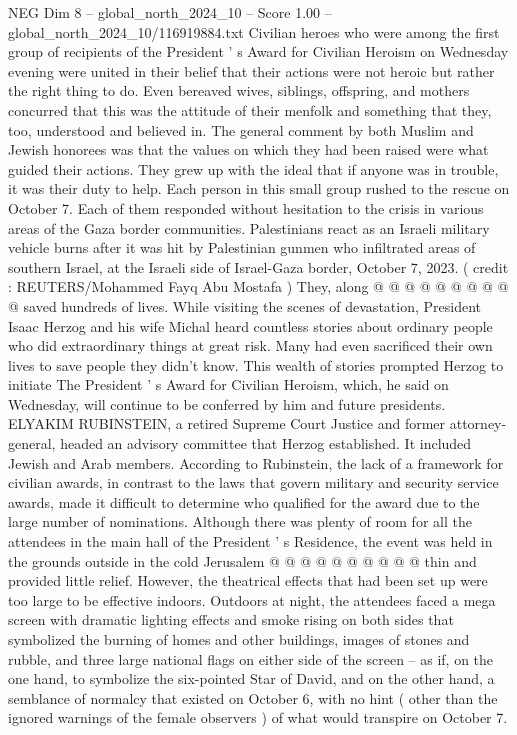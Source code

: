 \begin{textsample}{NEG Dim 8 – global\_north\_2024\_10 – Score 1.00 – global\_north\_2024\_10/116919884.txt}  \label{ex:f8_neg_206}
Civilian heroes who were among the first group of recipients of the President ' s Award for Civilian Heroism on Wednesday evening were united in their belief that their actions were not heroic but rather the right thing to do.
Even bereaved wives, siblings, offspring, and mothers concurred that this was the attitude of their menfolk and something that they, too, understood and believed in.
The general comment by both Muslim and Jewish honorees was that the values on which they had been raised were what guided their actions.
They grew up with the ideal that if anyone was in trouble, it was their duty to help.
Each person in this small group rushed to the rescue on October 7.
Each of them responded without hesitation to the crisis in various areas of the Gaza border communities.
Palestinians react as an Israeli military vehicle burns after it was hit by Palestinian gunmen who infiltrated areas of southern Israel, at the Israeli side of Israel-Gaza border, October 7, 2023. ( credit : REUTERS/Mohammed Fayq Abu Mostafa ) They, along @ @ @ @ @ @ @ @ @ @ saved hundreds of lives.
While visiting the scenes of devastation, President Isaac Herzog and his wife Michal heard countless stories about ordinary people who did extraordinary things at great risk.
Many had even sacrificed their own lives to save people they didn't know.
This wealth of stories prompted Herzog to initiate The President ' s Award for Civilian Heroism, which, he said on Wednesday, will continue to be conferred by him and future presidents.
ELYAKIM RUBINSTEIN, a retired Supreme Court Justice and former attorney-general, headed an advisory committee that Herzog established.
It included Jewish and Arab members.
According to Rubinstein, the lack of a framework for civilian awards, in contrast to the laws that govern military and security service awards, made it difficult to determine who qualified for the award due to the large number of nominations.
Although there was plenty of room for all the attendees in the main hall of the President ' s Residence, the event was held in the grounds outside in the cold Jerusalem @ @ @ @ @ @ @ @ @ @ thin and provided little relief.
However, the theatrical effects that had been set up were too large to be effective indoors.
Outdoors at night, the attendees faced a mega screen with dramatic lighting effects and smoke rising on both sides that symbolized the burning of homes and other buildings, images of stones and rubble, and three large national flags on either side of the screen -- as if, on the one hand, to symbolize the six-pointed Star of David, and on the other hand, a semblance of normalcy that existed on October 6, with no hint ( other than the ignored warnings of the female observers ) of what would transpire on October 7.

\end{textsample}
